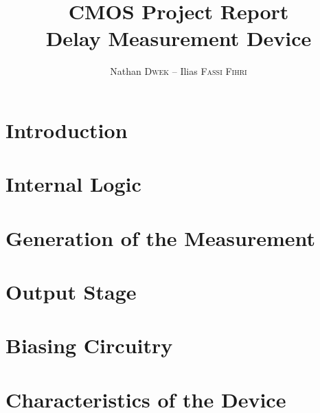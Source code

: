 
\title{CMOS Project Report\\Delay Measurement Device}
\author{Nathan \textsc{Dwek} -- Ilias \textsc{Fassi Fihri}}
\date{}


\maketitle
\tableofcontents
\clearpage
\hypersetup{allcolors=link}
\section{Introduction}


\section{Internal Logic}


\section{Generation of the Measurement}


\section{Output Stage}


\section{Biasing Circuitry}\label{sec:bias}


\section{Characteristics of the Device}




